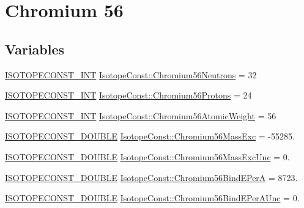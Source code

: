 \hypertarget{group___isotope_const-_chromium-_cr56}{}\section{Chromium 56}
\label{group___isotope_const-_chromium-_cr56}
\subsection*{Variables}
\begin{DoxyCompactItemize}
\item 
\mbox{\hyperlink{group___isotope_const-_macros_ga5f18360b3e99483a35c32d789e62621c}{I\+S\+O\+T\+O\+P\+E\+C\+O\+N\+S\+T\+\_\+\+I\+NT}} \mbox{\hyperlink{group___isotope_const-_chromium-_cr56_ga2e97422cbd12c9ed470fff736b5268c8}{Isotope\+Const\+::\+Chromium56\+Neutrons}} = 32
\item 
\mbox{\hyperlink{group___isotope_const-_macros_ga5f18360b3e99483a35c32d789e62621c}{I\+S\+O\+T\+O\+P\+E\+C\+O\+N\+S\+T\+\_\+\+I\+NT}} \mbox{\hyperlink{group___isotope_const-_chromium-_cr56_gabd098c5a3a6ef5d358f130938cf23648}{Isotope\+Const\+::\+Chromium56\+Protons}} = 24
\item 
\mbox{\hyperlink{group___isotope_const-_macros_ga5f18360b3e99483a35c32d789e62621c}{I\+S\+O\+T\+O\+P\+E\+C\+O\+N\+S\+T\+\_\+\+I\+NT}} \mbox{\hyperlink{group___isotope_const-_chromium-_cr56_gaf7f0bd3cfef314ac0103cbfc12ed80d1}{Isotope\+Const\+::\+Chromium56\+Atomic\+Weight}} = 56
\item 
\mbox{\hyperlink{group___isotope_const-_macros_ga8f45a7272ce02c0b4c65c44636ed719a}{I\+S\+O\+T\+O\+P\+E\+C\+O\+N\+S\+T\+\_\+\+D\+O\+U\+B\+LE}} \mbox{\hyperlink{group___isotope_const-_chromium-_cr56_ga3b1eb10ec0c353a064cd6ad1ba085115}{Isotope\+Const\+::\+Chromium56\+Mass\+Exc}} = -\/55285.
\item 
\mbox{\hyperlink{group___isotope_const-_macros_ga8f45a7272ce02c0b4c65c44636ed719a}{I\+S\+O\+T\+O\+P\+E\+C\+O\+N\+S\+T\+\_\+\+D\+O\+U\+B\+LE}} \mbox{\hyperlink{group___isotope_const-_chromium-_cr56_gab43d5933e9835adef9b6e7d441584b9c}{Isotope\+Const\+::\+Chromium56\+Mass\+Exc\+Unc}} = 0.
\item 
\mbox{\hyperlink{group___isotope_const-_macros_ga8f45a7272ce02c0b4c65c44636ed719a}{I\+S\+O\+T\+O\+P\+E\+C\+O\+N\+S\+T\+\_\+\+D\+O\+U\+B\+LE}} \mbox{\hyperlink{group___isotope_const-_chromium-_cr56_ga823b1743aedc1e5ce038b2ea56a2c86e}{Isotope\+Const\+::\+Chromium56\+Bind\+E\+PerA}} = 8723.
\item 
\mbox{\hyperlink{group___isotope_const-_macros_ga8f45a7272ce02c0b4c65c44636ed719a}{I\+S\+O\+T\+O\+P\+E\+C\+O\+N\+S\+T\+\_\+\+D\+O\+U\+B\+LE}} \mbox{\hyperlink{group___isotope_const-_chromium-_cr56_ga369915b1804e509305def4928bbb89be}{Isotope\+Const\+::\+Chromium56\+Bind\+E\+Per\+A\+Unc}} = 0.

\end{DoxyCompactItemize}
